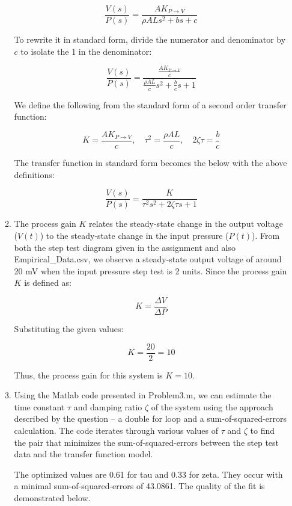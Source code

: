 \documentclass[12pt]{article}
\begin{document}
\begin{enumerate}
\begin{enumerate}
    \[
    \frac{V(s)}{P(s)} = \frac{A K_{P \to V}}{\rho A L s^2 + b s + c}
    \]

    To rewrite it in standard form, divide the numerator and denominator by \(c\) to isolate the 1 in the denominator:

    \[
    \frac{V(s)}{P(s)} = \frac{\frac{A K_{P \to V}}{c}}{\frac{\rho A L}{c}s^2 + \frac{b}{c}s + 1}
    \]

    We define the following from the standard form of a second order transfer function:

    \[
    K = \frac{A K_{P \to V}}{c}, \quad \tau^2 = \frac{\rho A L}{c}, \quad 2\zeta\tau = \frac{b}{c}
    \]

    The transfer function in standard form becomes the below with the above definitions:

    \[
    \frac{V(s)}{P(s)} = \frac{K}{\tau^2 s^2 + 2\zeta\tau s + 1}
    \]

    \item
    The process gain \(K\) relates the steady-state change in the output voltage (\(V(t)\)) to the steady-state change in the input pressure (\(P(t)\)). From both the step test diagram given in the assignment and also Empirical\_Data.csv, we observe a steady-state output voltage of around 20 mV when the input pressure step test is 2 units. Since the process gain \(K\) is defined as:

    \[
    K = \frac{\Delta V}{\Delta P}
    \]

    Substituting the given values:

    \[
    K = \frac{20}{2} = 10
    \]

    Thus, the process gain for this system is \(K = 10\).

    \item
    Using the Matlab code presented in Problem3.m, we can estimate the time constant \(\tau\) and damping ratio \(\zeta\) of the system using the approach described by the question -- a double for loop and a sum-of-squared-errors calculation. The code iterates through various values of \(\tau\) and \(\zeta\) to find the pair that minimizes the sum-of-squared-errors between the step test data and the transfer function model. \linebreak
    
    The optimized values are 0.61 for tau and 0.33 for zeta. They occur with a minimal sum-of-squared-errors of 43.0861. The quality of the fit is demonstrated below.


\end{enumerate}
\end{enumerate}
\end{document}
